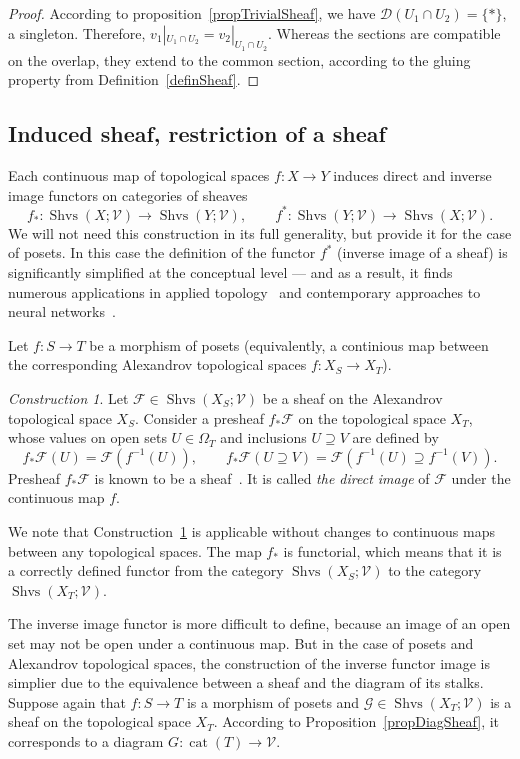 \documentclass[english,12pt,oneside]{amsproc}
\DeclareMathOperator{\cat}{cat}
\DeclareMathOperator{\Shvs}{Shvs}
\newcommand{\ca}[1]{\mathcal{#1}}
\newcommand{\Vv}{\mathcal{V}}
\newcounter{stmcounter}[section]
\numberwithin{equation}{section}
\theoremstyle{plain}
\theoremstyle{definition}
\theoremstyle{remark}
\newtheorem{con}[stmcounter]{Construction}
\begin{document}
\begin{proof}
According to proposition~\ref{propTrivialSheaf}, we have $\ca{D}(U_1\cap U_2)=\{\ast\}$, a singleton. Therefore, $v_1|_{U_1\cap U_2}=v_2|_{U_1\cap U_2}$. Whereas the sections are compatible on the overlap, they extend to the common section, according to the gluing property from Definition~\ref{definSheaf}.
\end{proof}

\subsection{Induced sheaf, restriction of a sheaf}

Each continuous map of topological spaces $f\colon X\to Y$ induces direct  and  inverse image functors on categories of sheaves
\[
f_*\colon \Shvs(X;\Vv)\to \Shvs(Y;\Vv), \qquad f^*\colon \Shvs(Y;\Vv)\to \Shvs(X;\Vv).
\]
We will not need this construction in its full generality, but provide it for the case of posets. In this case the definition of the functor $f^*$ (inverse image of a sheaf) is significantly simplified at the conceptual level ---  and  as a result, it finds numerous applications in applied topology~\cite{Curry} and contemporary approaches to neural networks~\cite{ShDif, AyzSheaves}.

Let $f\colon S\to T$ be a morphism of posets (equivalently, a continious map between the corresponding Alexandrov topological spaces $f\colon X_S\to X_T$).

\begin{con}\label{conDirectImage}
Let $\ca{F}\in\Shvs(X_S;\Vv)$ be a sheaf on the Alexandrov topological space $X_S$. Consider a presheaf $f_*\ca{F}$ on the topological space $X_T$, whose values on open sets $U\in\Omega_T$  and inclusions $U\supseteq V$ are defined by
\[
f_*\ca{F}(U)=\ca{F}(f^{-1}(U)),\qquad f_*\ca{F}(U\supseteq V)=\ca{F}(f^{-1}(U)\supseteq f^{-1}(V)).
\]
Presheaf $f_*\ca{F}$ is known to be a sheaf~\cite{Iversen}. It is called \emph{the direct image} of $\ca{F}$ under the continuous map $f$.
\end{con}

We note that Construction~\ref{conDirectImage} is applicable without changes to continuous maps between any topological spaces. The map $f_*$ is functorial, which means that it is a correctly defined functor from the category $\Shvs(X_S;\Vv)$ to the category $\Shvs(X_T;\Vv)$.

The inverse image functor is more difficult to define, because an image of an open set may not be open under a continuous map. But in the case of posets  and  Alexandrov topological spaces, the construction of the inverse functor image is simplier due to the equivalence between a sheaf  and  the diagram of its stalks. Suppose again that $f\colon S\to T$ is a morphism of posets  and  $\ca{G}\in\Shvs(X_T;\Vv)$ is a sheaf on the topological space $X_T$. According to Proposition~\ref{propDiagSheaf}, it corresponds to a diagram $G\colon \cat(T)\to\Vv$.
\end{document}
